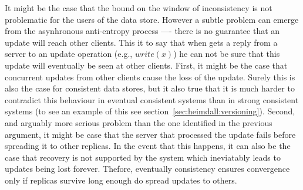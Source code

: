 It might be the case that the bound on the  window of inconsistency is not problematic for the users of the  data store. 
However a subtle problem can emerge from the asynhronous anti-entropy process ---- there is no guarantee that an update will reach other clients. 
This it to say that when gets a reply from a server to an update operation (e.g., $write(x)$)  he can not be sure that this update will eventually be seen at other clients. 
First, it might be the case that concurrent updates from other clients cause the loss of the update. 
Surely this is also the case for consistent data stores, but it also true that it is much harder to contradict this behaviour in eventual consistent systems than in strong consistent systems (to see an example of this see section~\ref{sec:heimdall:versioning}). 
Second, and arguably more serious problem than the one identified in the previous argument, it might be case that the server that processed the update fails before spreading it to other replicas. 
In the event that this happens, it can also be the case that recovery is not supported by the system which ineviatably leads to updates being lost forever. 
Thefore, eventually consistency ensures convergence only if replicas survive long enough do spread updates to others. 


